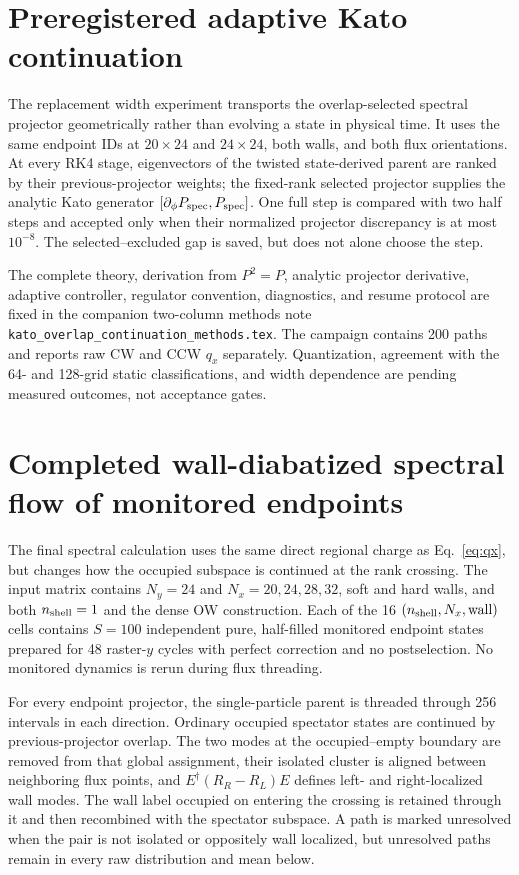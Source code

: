 \documentclass[aps,prb,twocolumn,floatfix,nofootinbib,superscriptaddress]{revtex4-2}
\newcommand{\code}[1]{\texttt{#1}}
\begin{document}
\section{Preregistered adaptive Kato continuation}

The replacement width experiment transports the overlap-selected spectral
projector geometrically rather than evolving a state in physical time.  It
uses the same endpoint IDs at $20\times24$ and $24\times24$, both walls, and
both flux orientations.  At every RK4 stage, eigenvectors of the twisted
state-derived parent are ranked by their previous-projector weights; the
fixed-rank selected projector supplies the analytic Kato generator
$[\partial_\phi P_{\rm spec},P_{\rm spec}]$.  One full step is compared with
two half steps and accepted only when their normalized projector discrepancy
is at most $10^{-8}$.  The selected--excluded gap is saved, but does not alone
choose the step.

The complete theory, derivation from $P^2=P$, analytic projector derivative,
adaptive controller, regulator convention, diagnostics, and resume protocol
are fixed in the companion two-column methods note
\code{kato\_overlap\_continuation\_methods.tex}.  The campaign contains 200
paths and reports raw CW and CCW $q_x$ separately.  Quantization, agreement
with the 64- and 128-grid static classifications, and width dependence are
pending measured outcomes, not acceptance gates.


\section{Completed wall-diabatized spectral flow of monitored endpoints}

The final spectral calculation uses the same direct regional charge as
Eq.~\eqref{eq:qx}, but changes how the occupied subspace is continued at the
rank crossing.  The input matrix contains $N_y=24$ and
$N_x=20,24,28,32$, soft and hard walls, and both $n_{\rm shell}=1$ and the
dense OW construction.  Each of the 16 $(n_{\rm shell},N_x,{\rm wall})$
cells contains $S=100$ independent pure, half-filled monitored endpoint
states prepared for 48 raster-$y$ cycles with perfect correction and no
postselection.  No monitored dynamics is rerun during flux threading.

For every endpoint projector, the single-particle parent is threaded through
256 intervals in each direction.  Ordinary occupied spectator states are
continued by previous-projector overlap.  The two modes at the occupied--empty
boundary are removed from that global assignment, their isolated cluster is
aligned between neighboring flux points, and
$E^\dagger(R_R-R_L)E$ defines left- and right-localized wall modes.  The wall
label occupied on entering the crossing is retained through it and then
recombined with the spectator subspace.  A path is marked unresolved when the
pair is not isolated or oppositely wall localized, but unresolved paths remain
in every raw distribution and mean below.
\end{document}
